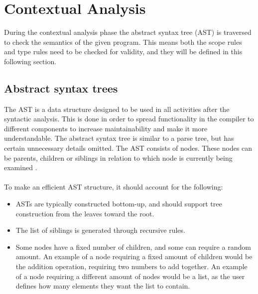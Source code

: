 \chapter{Contextual Analysis}
During the contextual analysis phase the abstract syntax tree (AST) is traversed to check the semantics of the given program. This means both the  scope rules and type rules need to be checked for validity, and they will be defined in this following section.

\section{Abstract syntax trees}\label{ca:ast}
The AST is a data structure designed to be used in all activities after the syntactic analysis. This is done in order to spread functionality in the compiler to different components to increase maintainability and make it more understandable. The abstract syntax tree is similar to a parse tree, but has certain unnecessary details omitted. The AST consists of nodes. These nodes can be parents, children or siblings in relation to which node is currently being examined \cite{CraftinfACompiler}.
\\\\
To make an efficient AST structure, it should account for the following:
\begin{itemize}
    \item ASTs are typically constructed bottom-up, and should support tree construction from the leaves toward the root.
    \item The list of siblings is generated through recursive rules.
    \item Some nodes have a fixed number of children, and some can require a random amount. An example of a node requiring a fixed amount of children would be the addition operation, requiring two numbers to add together. An example of a node requiring a different amount of nodes would be a list, as the user defines how many elements they want the list to contain.
\end{itemize}
